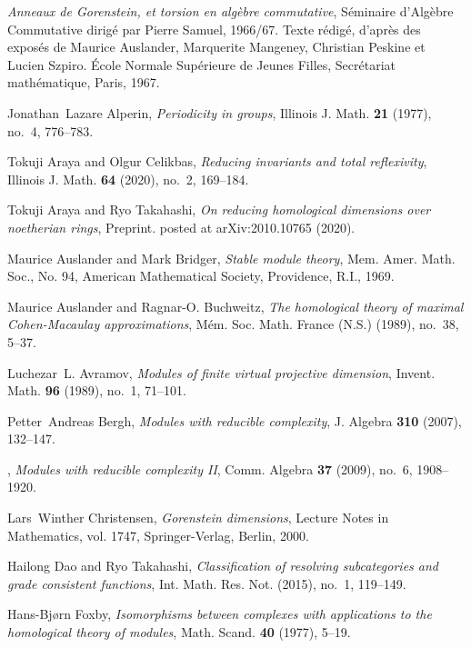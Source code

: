 \documentclass{amsart}
\theoremstyle{plain} %
\theoremstyle{definition}
\begin{document}
\begin{thebibliography}{10}

\emph{Anneaux de {G}orenstein, et torsion en alg\`ebre commutative},
  S\'eminaire d'Alg\`ebre Commutative dirig\'e par Pierre Samuel, 1966/67.
  Texte r\'edig\'e, d'apr\`es des expos\'es de Maurice Auslander, Marquerite
  Mangeney, Christian Peskine et Lucien Szpiro. \'Ecole Normale Sup\'erieure de
  Jeunes Filles, Secr\'etariat math\'ematique, Paris, 1967.

Jonathan~Lazare Alperin, \emph{Periodicity in groups}, Illinois J. Math.
  \textbf{21} (1977), no.~4, 776--783.

Tokuji Araya and Olgur Celikbas, \emph{Reducing invariants and total
  reflexivity}, Illinois J. Math. \textbf{64} (2020), no.~2, 169--184.

Tokuji Araya and Ryo Takahashi, \emph{On reducing homological dimensions over
  noetherian rings}, Preprint. posted at arXiv:2010.10765 (2020).

Maurice Auslander and Mark Bridger, \emph{Stable module theory}, Mem. Amer.
  Math. Soc., No. 94, American Mathematical Society, Providence, R.I., 1969.

Maurice Auslander and Ragnar-O. Buchweitz, \emph{The homological theory of
  maximal {C}ohen-{M}acaulay approximations}, M\'em. Soc. Math. France (N.S.)
  (1989), no.~38, 5--37.

Luchezar~L. Avramov, \emph{Modules of finite virtual projective dimension},
  Invent. Math. \textbf{96} (1989), no.~1, 71--101.

Petter~Andreas Bergh, \emph{Modules with reducible complexity}, J. Algebra
  \textbf{310} (2007), 132--147.

\bysame, \emph{Modules with reducible complexity {II}}, Comm. Algebra
  \textbf{37} (2009), no.~6, 1908--1920.

Lars~Winther Christensen, \emph{Gorenstein dimensions}, Lecture Notes in
  Mathematics, vol. 1747, Springer-Verlag, Berlin, 2000.

Hailong Dao and Ryo Takahashi, \emph{Classification of resolving subcategories
  and grade consistent functions}, Int. Math. Res. Not. (2015), no.~1,
  119--149.

Hans-Bj{\o}rn Foxby, \emph{Isomorphisms between complexes with applications to
  the homological theory of modules}, Math. Scand. \textbf{40} (1977), 5--19.


\end{thebibliography}
\end{document}
